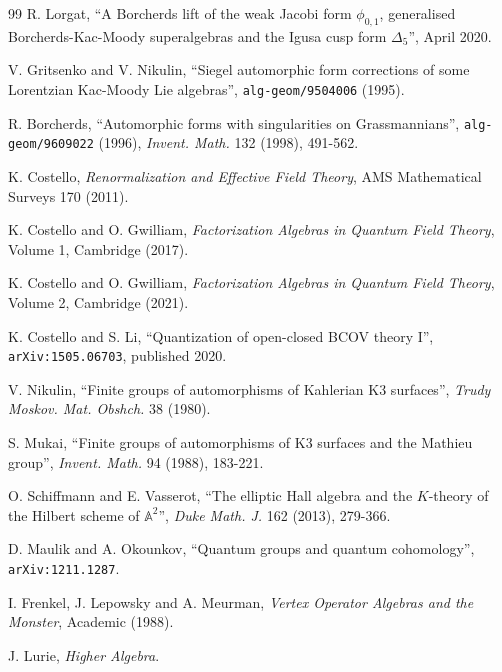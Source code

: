 \documentclass[11pt]{amsart}
\theoremstyle{plain}
\theoremstyle{definition}
\theoremstyle{remark}
\begin{document}
\begin{thebibliography}{99}
R. Lorgat, ``A Borcherds lift of the weak Jacobi form \(\phi_{0,1}\),
generalised Borcherds-Kac-Moody superalgebras and the Igusa cusp form
\(\Delta_5\)'', April 2020.

V. Gritsenko and V. Nikulin, ``Siegel automorphic form corrections of
some Lorentzian Kac-Moody Lie algebras'', \texttt{alg-geom/9504006}
(1995).

R. Borcherds, ``Automorphic forms with singularities on
Grassmannians'', \texttt{alg-geom/9609022} (1996),
\emph{Invent. Math.} 132 (1998), 491-562.

K. Costello, \emph{Renormalization and Effective Field Theory}, AMS
Mathematical Surveys 170 (2011).

K. Costello and O. Gwilliam, \emph{Factorization Algebras in Quantum
Field Theory}, Volume 1, Cambridge (2017).

K. Costello and O. Gwilliam, \emph{Factorization Algebras in Quantum
Field Theory}, Volume 2, Cambridge (2021).

K. Costello and S. Li, ``Quantization of open-closed BCOV theory I'',
\texttt{arXiv:1505.06703}, published 2020.

V. Nikulin, ``Finite groups of automorphisms of Kahlerian K3 surfaces'',
\emph{Trudy Moskov. Mat. Obshch.} 38 (1980).

S. Mukai, ``Finite groups of automorphisms of K3 surfaces and the
Mathieu group'', \emph{Invent. Math.} 94 (1988), 183-221.

O. Schiffmann and E. Vasserot, ``The elliptic Hall algebra and the
\(K\)-theory of the Hilbert scheme of \(\mathbb A^2\)'',
\emph{Duke Math. J.} 162 (2013), 279-366.

D. Maulik and A. Okounkov, ``Quantum groups and quantum cohomology'',
\texttt{arXiv:1211.1287}.

I. Frenkel, J. Lepowsky and A. Meurman,
\emph{Vertex Operator Algebras and the Monster}, Academic (1988).

J. Lurie, \emph{Higher Algebra}.
\end{thebibliography}
\end{document}
